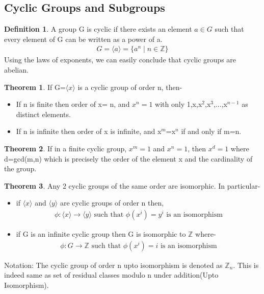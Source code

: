 \documentclass[12pt,a4paper,oneside]{report}
\theoremstyle{definition}
\newtheorem{definition}{Definition}[chapter]
\newtheorem{theorem}{Theorem}
\begin{document}
\subsection{Cyclic Groups and Subgroups}
\begin{definition}
  A group G is cyclic if there exists an element $a \in G$ such that every element of G can be written as a power of a.
  \begin{align*}
    G = \langle a \rangle = \{a^n \mid n \in \mathbb{Z}\}
  \end{align*}
  Using the laws of exponents, we can easily conclude that cyclic groups are abelian.
\end{definition}
\begin{theorem}
  If G=$\langle x \rangle $ is a cyclic group of order n, then-
  \begin{itemize}
    \item If n is finite then order of x= n, and $x^n=1$ with only 1,x,x$^2$,x$^3$,...,x$^{n-1}$ as distinct elements.
    \item If n is infinite then order of x is infinite, and x$^m$=x$^n$ if and only if m=n.
  \end{itemize}
\end{theorem}
\begin{theorem}
  If in a finite cyclic group, $x^m=1$ and $x^n=1$, then $x^d=1$ where d=gcd(m,n) which is precisely the order of the element x and the cardinality of the group.
\end{theorem}
\begin{theorem}
  Any 2 cyclic groups of the same order are isomorphic.
  In particular-
  \begin{itemize}
    \item if $\langle x \rangle$ and $\langle y \rangle$ are cyclic groups of order n then,
    \begin{align*}
      \phi: \langle x \rangle \rightarrow \langle y \rangle \text{ such that } \phi(x^i)=y^i \text{ is an isomorphism}
    \end{align*}
    \item if G is an infinite cyclic group then G is isomorphic to $\mathbb{Z}$ where-
    \begin{align*}
      \phi: G \rightarrow \mathbb{Z} \text{ such that } \phi(x^i)=i \text{ is an isomorphism}
    \end{align*}
  \end{itemize}
\end{theorem}
Notation: The cyclic group of order n upto isomorphism is denoted as $\mathbb{Z}_n$. This is indeed same as set of residual classes modulo n under addition(Upto Isomorphism).
\end{document}
